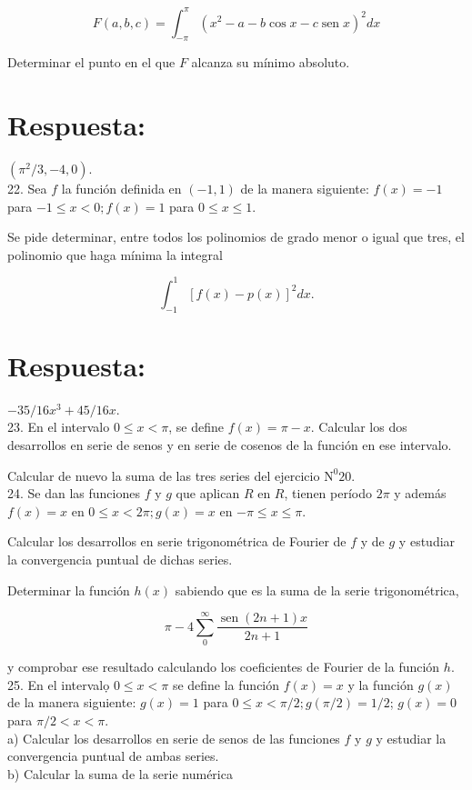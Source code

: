 \documentclass[10pt]{article}
\theoremstyle{plain}
\theoremstyle{definition}
\theoremstyle{remark}
\begin{document}
$$
F(a, b, c)=\int_{-\pi}^{\pi}\left(x^{2}-a-b \cos x-c \operatorname{sen} x\right)^{2} d x
$$

Determinar el punto en el que $F$ alcanza su mínimo absoluto.

\section*{Respuesta:}
$\left(\pi^{2} / 3,-4,0\right)$.\\
22. Sea $f$ la función definida en $(-1,1)$ de la manera siguiente: $f(x)=-1$ para $-1 \leqslant x<0 ; f(x)=1$ para $0 \leqslant x \leqslant 1$.

Se pide determinar, entre todos los polinomios de grado menor o igual que tres, el polinomio que haga mínima la integral

$$
\int_{-1}^{1}[f(x)-p(x)]^{2} d x .
$$

\section*{Respuesta:}
$-35 / 16 x^{3}+45 / 16 x$.\\
23. En el intervalo $0 \leqslant x<\pi$, se define $f(x)=\pi-x$. Calcular los dos desarrollos en serie de senos y en serie de cosenos de la función en ese intervalo.

Calcular de nuevo la suma de las tres series del ejercicio $\mathrm{N}^{0} 20$.\\
24. Se dan las funciones $f$ y $g$ que aplican $R$ en $R$, tienen período $2 \pi$ y además $f(x)=x$ en $0 \leqslant x<2 \pi ; g(x)=x$ en $-\pi \leqslant x \leqslant \pi$.

Calcular los desarrollos en serie trigonométrica de Fourier de $f$ y de $g$ y estudiar la convergencia puntual de dichas series.

Determinar la función $h(x)$ sabiendo que es la suma de la serie trigonométrica,

$$
\pi-4 \sum_{0}^{\infty} \frac{\operatorname{sen}(2 n+1) x}{2 n+1}
$$

y comprobar ese resultado calculando los coeficientes de Fourier de la función $h$.\\
25. En el intervalọ $0 \leqslant x<\pi$ se define la función $f(x)=x$ y la función $g(x)$ de la manera siguiente: $g(x)=1$ para $0 \leqslant x<\pi / 2 ; g(\pi / 2)=1 / 2$; $g(x)=0$ para $\pi / 2<x<\pi$.\\
a) Calcular los desarrollos en serie de senos de las funciones $f$ y $g$ y estudiar la convergencia puntual de ambas series.\\
b) Calcular la suma de la serie numérica
\end{document}
